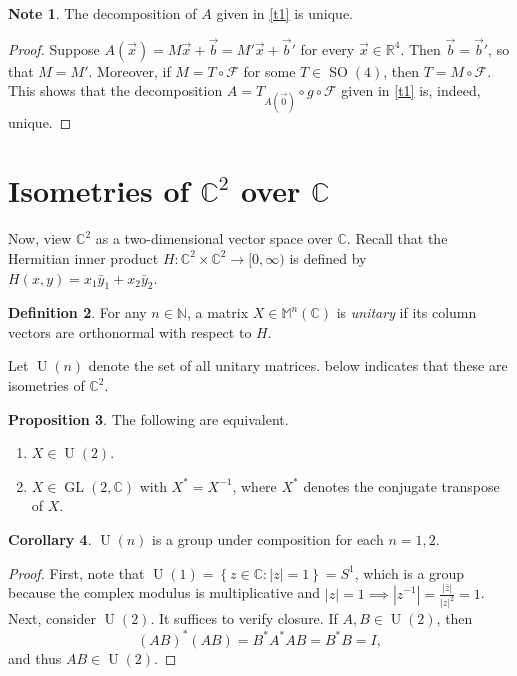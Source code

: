 \documentclass[10pt,letterpaper,cm]{nupset}
\theoremstyle{definition}
\newtheorem{definition}{Definition}[section]
\newtheorem{note}[definition]{Note}
\theoremstyle{theorem}
\newtheorem{cor}[definition]{Corollary}
\newtheorem{prop}[definition]{Proposition}
\theoremstyle{remark}
\newcommand{\C}{\mathbb C}
\newcommand{\F}{\mathcal F}
\newcommand{\M}{\mathbb M}
\newcommand{\N}{\mathbb N}
\newcommand{\R}{\mathbb R}
\newcommand{\1}{\mathbf{1}}
\renewcommand{\b}{\vec b}
\newcommand{\x}{\vec x}
\newcommand{\0}{\vec {0}}
\DeclareMathOperator{\SO}{SO}
\DeclareMathOperator{\GL}{GL}
\DeclareMathOperator{\U}{U}
\begin{document}
\begin{note}\label{unique}
The  decomposition of $A$ given in \cref{t1} is unique. 
\end{note}

\begin{proof}
Suppose $A(\x)=M\x +\b =M'\x+\b'$ for every $\x\in \R^4$. Then $\b =\b'$, so that $M=M'$.  Moreover, if $M=T\circ \F$ for some $T\in \SO(4)$, then $T=M\circ \F$. This shows that the decomposition $A=T_{A(\0)}\circ g\circ \F$ given in \cref{t1}  is, indeed,  unique.
\end{proof}

\section{Isometries of $\C^2$ over $\C$}

Now, view $\C^2$ as a two-dimensional vector space over $\C$. Recall that the Hermitian inner product \linebreak $H:\C^2 \times \C^2 \to [0,\infty)$ is defined by $H(x,y)=x_1\bar{y}_1+x_2\bar{y}_2$.

\begin{definition}
For any $n\in \N$, a matrix $X\in \M^n(\C)$ is \textit{unitary} if its column vectors are orthonormal with respect to $H$.  
\end{definition}


Let $\U(n)$ denote the set of all unitary matrices.  below indicates that these are isometries of $\C^2$.


\begin{prop}
The following are equivalent.
\begin{enumerate}[label=(\alph*)]  
\item $X \in \U(2)$. 
\item $X\in \GL(2, \C)$ with $X^\ast =X^{-1}$, where $X^\ast$ denotes the conjugate transpose of $X$.
\end{enumerate}
\end{prop}

\begin{cor} $\U(n)$ is a group under composition for each $n=1,2$. 
\end{cor}

\begin{proof}
First, note that $\U(1)=\left\{z\in \C:|z|=1\right\}=S^1$, which is a group because the complex modulus is multiplicative and $|z|=1\implies \left\lvert{z^{-1}}\right\rvert=\frac{\left\lvert{\bar{z}}\right\rvert}{\left\lvert{z}\right\rvert^2}=1$. Next, consider $\U(2)$. It suffices to verify closure. If $A,B\in \U(2)$, then $$\left(AB\right)^\ast(AB)=B^\ast A^\ast AB=B^\ast B=I,$$ and thus  $AB\in \U(2)$.
\end{proof}
\end{document}
